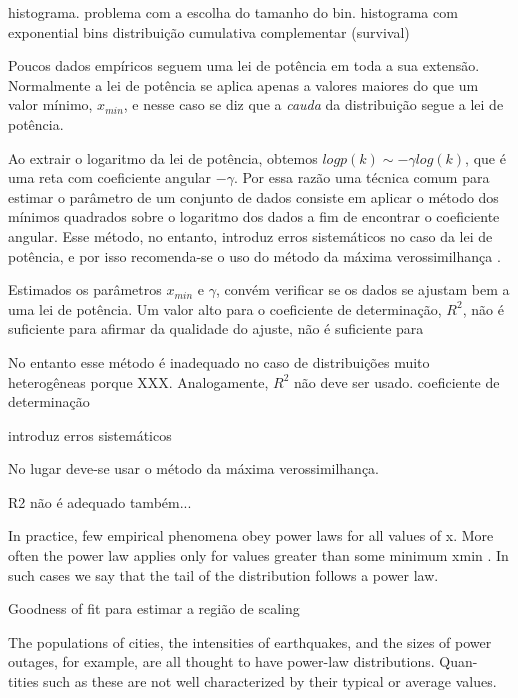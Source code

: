 \documentclass{article}
\begin{document}
histograma. problema com a escolha do tamanho do bin. histograma com exponential bins
distribuição cumulativa complementar (survival)

Poucos dados empíricos seguem uma lei de potência em toda a sua extensão. Normalmente a lei de potência se aplica apenas a valores maiores do que um valor mínimo, $x_{min}$, e nesse caso se diz que a \emph{cauda} da distribuição segue a lei de potência.

Ao extrair o logaritmo da lei de potência, obtemos $log p(k) \sim -\gamma log(k)$, que é uma reta com coeficiente angular $-\gamma$. Por essa razão uma técnica comum para estimar o parâmetro \gamma de um conjunto de dados consiste em aplicar o método dos mínimos quadrados sobre o logaritmo dos dados a fim de encontrar o coeficiente angular. Esse método, no entanto, introduz erros sistemáticos no caso da lei de potência, e por isso recomenda-se o uso do método da máxima verossimilhança \cite{Clauset2007}.

Estimados os parâmetros $x_{min}$ e $\gamma$, convém verificar se os dados se ajustam bem a uma lei de potência. Um valor alto para o coeficiente de determinação, $R^2$, não é suficiente para afirmar da qualidade do ajuste, não é suficiente para

No entanto esse método é inadequado no caso de distribuições muito heterogêneas porque XXX. Analogamente, $R^2$ não deve ser usado.
coeficiente de determinação

introduz erros sistemáticos

No lugar deve-se usar o método da máxima verossimilhança. 

R2 não é adequado também...

    In practice, few empirical phenomena obey power laws for all values of x. More
often the power law applies only for values greater than some minimum xmin . In such
cases we say that the tail of the distribution follows a power law.

Goodness of fit para estimar a região de scaling



              The populations of cities, the intensities of earthquakes, and the sizes of
power outages, for example, are all thought to have power-law distributions. Quan-
tities such as these are not well characterized by their typical or average values.
\end{document}

